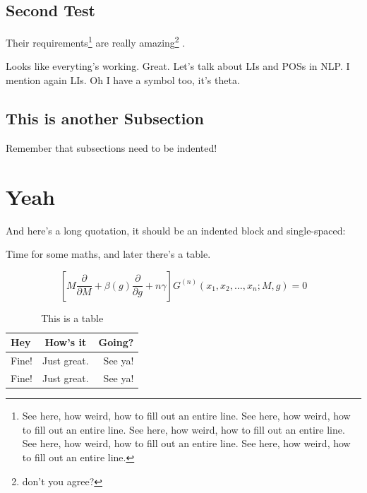 \begin{subsecs}
\subsection{Second Test}
Their \cite{audibert:2004} requirements\footnote{See here, how weird, how to fill out an entire line. See here, how weird, how to fill out an entire line. See here, how weird, how to fill out an entire line. See here, how weird, how to fill out an entire line. See here, how weird, how to fill out an entire line. } are really amazing\footnote{don't you agree?} \cite{budanitsky:hirst:2006}.

Looks like everyting's working. Great. Let's talk about \glspl{LI} and \glspl{POS} in \gls{NLP}. I mention again \glspl{LI}. Oh I have a symbol too, it's \gls{theta}.

\subsection{This is another Subsection}

Remember that subsections need to be indented! 

\end{subsecs}

\section{Yeah}

And here's a long quotation, it should be an indented block and single-spaced:

\begin{quotation}
\lipsum[5-6]
\end{quotation}

Time for some maths, and later there's a table.

\begin{equation}
\left[M\frac{\partial }{\partial M}+\beta(g)\frac{\partial }{\partial g}+n\gamma\right] G^{(n)}(x_1,x_2,\ldots,x_n;M,g)=0
\end{equation}

\begin{table}[hbt!]
\caption{This is a table}
\centering
\begin{tabular}{ l c r }
\hline
Hey & How's it & Going?\\ \hline
Fine! & Just great. & See ya!\\
Fine! & Just great. & See ya!\\
\hline
\end{tabular}
\end{table}

\lipsum[7]